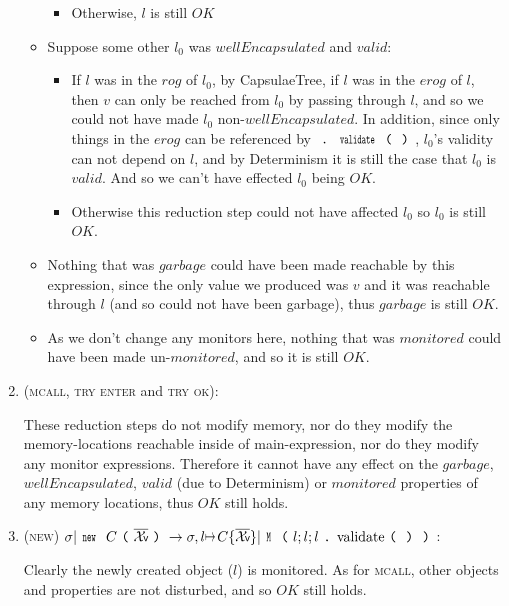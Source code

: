 \begin{enumerate}
\begin{itemize}
\begin{itemize}
		    \item Otherwise, $l$ is still $OK$
    	\end{itemize}

	\item Suppose some other $l_0$ was $wellEncapsulated$ and $valid$:
	\begin{itemize}
			\item If $l$ was in the $rog$ of $l_0$, by CapsulaeTree, if $l$ was in the $erog$ of $l$, then $v$ can only be reached from $l_0$ by passing through $l$, and so we could not have made $l_0$ non-$wellEncapsulated$. In addition, since only things in the $erog$ can be referenced by $\singleDot\Kw{validate}\oR\cR$, $l_0$’s validity can not depend on $l$, and by Determinism it is still the case that $l_0$ is $valid$. And so we can’t have effected $l_0$ being $OK$.
			\item Otherwise this reduction step could not have affected $l_0$ so $l_0$ is still $OK$.
	\end{itemize}


	\item Nothing that was $\mathit{garbage}$ could have been made reachable by this expression, since the only value we produced was $v$ and it was reachable through $l$ (and so could not have been garbage), thus $garbage$ is still $OK$.

	\item As we don’t change any monitors here, nothing that was $monitored$ could have been made un-$monitored$, and so it is still $OK$.
\end{itemize}

\item (\textsc{mcall}, \textsc{try enter} and \textsc{try ok}):

	These reduction steps do not modify memory, nor do they modify the memory-locations reachable inside of main-expression, nor do they modify any monitor expressions. Therefore it cannot have any effect on the $garbage$, $wellEncapsulated$, $valid$ (due to Determinism) or $monitored$ properties of any memory locations, thus $\mathit{OK}$ still holds.

\item (\textsc{new}) $\sigma|\Kw{new}\ C\oR\vs\cR\rightarrow \sigma,l\mapsto C\{\vs\}| \Kw{M}\oR l;l;l\singleDot\text{validate}\oR\cR\cR$:

	Clearly the newly created object ($l$) is monitored. As for \textsc{mcall}, other objects and properties are not disturbed, and so $\mathit{OK}$ still holds.



\end{enumerate}
